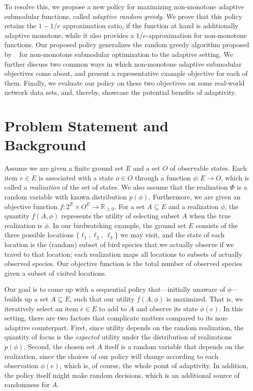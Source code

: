 \documentclass{article}
\newcommand{\citet}[1]{\citeauthor{#1}~\shortcite{#1}}
\begin{document}
To resolve this, we propose a new policy for maximizing non-monotone adaptive submodular functions, called \emph{adaptive random greedy}.
We prove that this policy retains the $1-1/e$ approximation ratio, if the function at hand is additionally adaptive monotone, while it also provides a $1/e$-approximation for non-monotone functions.
Our proposed policy generalizes the random greedy algorithm proposed by \citet{buchbinder14} for non-monotone submodular optimization to the adaptive setting.
We further discuss two common ways in which non-monotone adaptive submodular objectives come about, and present a representative example objective for each of them.
Finally, we evaluate our policy on these two objectives on some real-world network data sets, and, thereby, showcase the potential benefits of adaptivity.

\section{Problem Statement and Background}
Assume we are given a finite ground set $E$ and a set $O$ of observable states.
Each item $e \in E$ is associated with a state $o \in O$ through a function $\phi : E \to O$, which is called a \emph{realization} of the set of states.
We also assume that the realization $\Phi$ is a random variable with known distribution $p(\phi)$.
Furthermore, we are given an objective function $f : 2^E \times O^E \to \mathbb{R}_{\geq 0}$.
For a set $A \subseteq E$ and a realization $\phi$, the quantity $f(A, \phi)$ represents the utility of selecting subset $A$ when the true realization is $\phi$.
In our birdwatching example, the ground set $E$ consists of the three possible locations $\{\ell_1, \ell_2$, $\ell_3\}$ we may visit, and the state of each location is the (random) subset of bird species that we actually observe if we travel to that location; each realization maps all locations to subsets of actually observed species.
Our objective function is the total number of observed species given a subset of visited locations.

Our goal is to come up with a sequential policy that---initially unaware of $\phi$---builds up a set $A \subseteq E$, such that our utility $f(A, \phi)$ is maximized.
That is, we iteratively select an item $e \in E$ to add to $A$ and observe its state $\phi(e)$.
In this setting, there are two factors that complicate matters compared to its non-adaptive counterpart.
First, since utility depends on the random realization, the quantity of focus is the \emph{expected} utility under the distribution of realizations $p(\phi)$.
Second, the chosen set $A$ itself is a random variable that depends on the realization, since the choices of our policy will change according to each observation $\phi(e)$, which is, of course, the whole point of adaptivity.
In addition, the policy itself might make random decisions, which is an additional source of randomness for $A$.
\end{document}
